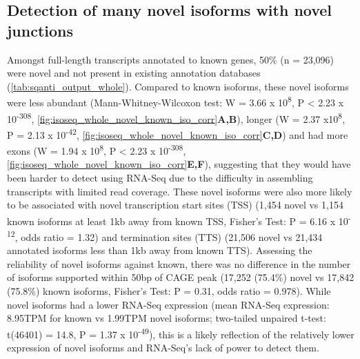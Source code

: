 \subsection{Detection of many novel isoforms with novel junctions}
\label{sec:whole_novelIso}
Amongst full-length transcripts annotated to known genes, 50\% (n = 23,096) were novel and not present in existing annotation databases (\cref{tab:sqanti_output_whole}). Compared to known isoforms, these novel isoforms were less abundant (Mann-Whitney-Wilcoxon test: W = 3.66 x 10\textsuperscript{8}, P < 2.23 x 10\textsuperscript{-308}, \cref{fig:isoseq_whole_novel_known_iso_corr}\textbf{A,B}), longer (W = 2.37 x10\textsuperscript{8}, P = 2.13 x 10\textsuperscript{-42}, \cref{fig:isoseq_whole_novel_known_iso_corr}\textbf{C,D}) and had more exons (W = 1.94 x 10\textsuperscript{8}, P < 2.23 x 10\textsuperscript{-308}, \cref{fig:isoseq_whole_novel_known_iso_corr}\textbf{E,F}), suggesting that they would have been harder to detect using RNA-Seq due to the difficulty in assembling transcripts with limited read coverage. These novel isoforms were also more likely to be associated with novel transcription start sites (TSS) (1,454 novel vs 1,154 known isoforms at least 1kb away from known TSS, Fisher's Test: P = 6.16 x 10\textsuperscript{-12}, odds ratio = 1.32) and termination sites (TTS) (21,506 novel vs 21,434 annotated isoforms less than 1kb away from known TTS). Assessing the reliability of novel isoforms against known, there was no difference in the number of isoforms supported within 50bp of CAGE peak (17,252 (75.4\%) novel vs 17,842 (75.8\%) known isoforms, Fisher's Test: P = 0.31, odds ratio = 0.978). While novel isoforms had a lower RNA-Seq expression (mean RNA-Seq expression: 8.95TPM for known vs 1.99TPM novel isoforms; two-tailed unpaired t-test: t(46401) = 14.8, P = 1.37 x 10\textsuperscript{-49}), this is a likely reflection of the relatively lower expression of novel isoforms and RNA-Seq's lack of power to detect them.


